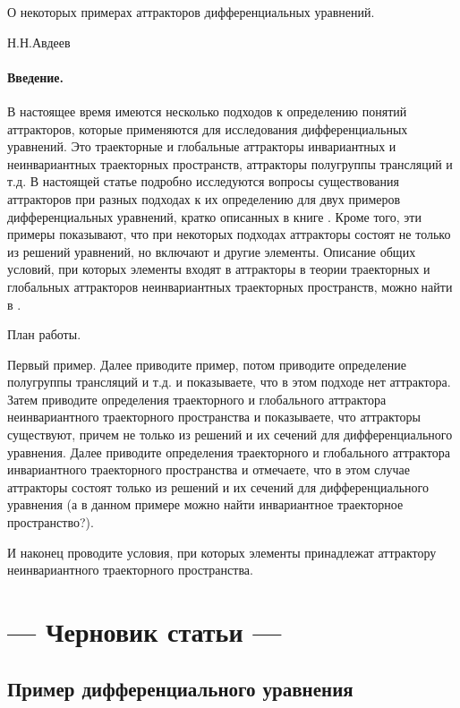 
\LARGE




О некоторых примерах аттракторов дифференциальных уравнений.

                                   Н.Н.Авдеев

\paragraph{Введение.}
В настоящее время имеются несколько подходов к определению понятий аттракторов,
которые применяются для исследования дифференциальных уравнений.
Это траекторные и глобальные аттракторы инвариантных и неинвариантных траекторных пространств,
аттракторы полугруппы трансляций и т.д.
В настоящей статье подробно исследуются вопросы существования аттракторов
при разных подходах к их определению для двух примеров дифференциальных уравнений,
кратко описанных в книге \cite{Vorotnikov}.
Кроме того, эти примеры показывают, что при некоторых подходах аттракторы состоят не только из решений уравнений,
но включают и другие элементы.
Описание общих условий,
при которых элементы входят в аттракторы в теории траекторных и глобальных аттракторов неинвариантных траекторных пространств,
можно найти в \cite{Kondratyev}.


План работы.

Первый пример.
Далее приводите пример, потом приводите определение полугруппы трансляций и т.д. и показываете, что в этом подходе нет аттрактора.
Затем приводите определения  траекторного и глобального аттрактора неинвариантного траекторного пространства и показываете, что аттракторы существуют, причем не только из решений  и их сечений для дифференциального уравнения.
Далее приводите определения  траекторного и глобального аттрактора инвариантного траекторного пространства  и отмечаете, что в этом случае аттракторы состоят только из решений и их сечений  для дифференциального уравнения
(а в данном примере можно найти инвариантное траекторное пространство?).

И наконец проводите условия, при которых элементы принадлежат аттрактору неинвариантного траекторного пространства.


\section*{--- Черновик статьи ---}


\subsection*{Пример дифференциального уравнения}


